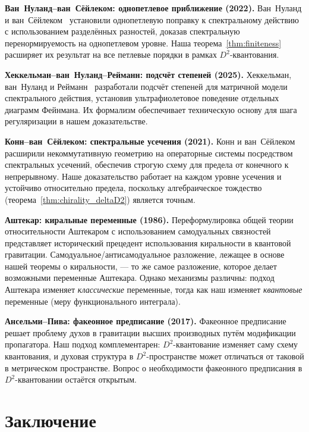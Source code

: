 \documentclass[12pt,a4paper]{article}
\theoremstyle{definition}
\theoremstyle{remark}
\begin{document}
\smallskip\noindent
\textbf{Ван~Нуланд--ван~Сёйлеком: однопетлевое приближение (2022).}
Ван~Нуланд и ван~Сёйлеком~\cite{vanNuland:2021oneloop} установили
однопетлевую поправку к спектральному действию с использованием
разделённых разностей, доказав спектральную перенормируемость на
однопетлевом уровне.  Наша теорема~\ref{thm:finiteness} расширяет их
результат на все петлевые порядки в рамках $D^2$-квантования.

\smallskip\noindent
\textbf{Хеккельман--ван~Нуланд--Рейманн: подсчёт степеней (2025).}
Хеккельман, ван~Нуланд и Рейманн~\cite{Hekkelman:2025power} разработали
подсчёт степеней для матричной модели спектрального действия, установив
ультрафиолетовое поведение отдельных диаграмм Фейнмана.  Их формализм
обеспечивает техническую основу для шага регуляризации в нашем
доказательстве.

\smallskip\noindent
\textbf{Конн--ван~Сёйлеком: спектральные усечения (2021).}
Конн и ван~Сёйлеком~\cite{Connes:2020trunc} расширили некоммутативную
геометрию на операторные системы посредством спектральных усечений,
обеспечив строгую схему для предела от конечного к непрерывному.  Наше
доказательство работает на каждом уровне усечения и устойчиво
относительно предела, поскольку алгебраическое тождество
(теорема~\ref{thm:chirality_deltaD2}) является точным.

\smallskip\noindent
\textbf{Аштекар: киральные переменные (1986).}
Переформулировка общей теории относительности Аштекаром с
использованием самодуальных
связностей~\cite{Ashtekar:1986yd} представляет исторический прецедент
использования киральности в квантовой гравитации.
Самодуальное/антисамодуальное разложение, лежащее в основе нашей
теоремы о киральности, --- то же самое разложение, которое делает
возможными переменные Аштекара.  Однако механизмы различны: подход
Аштекара изменяет \emph{классические} переменные, тогда как наш
изменяет \emph{квантовые} переменные (меру функционального интеграла).

\smallskip\noindent
\textbf{Ансельми--Пива: факеонное предписание (2017).}
Факеонное предписание~\cite{Anselmi:2017ygm} решает проблему духов в
гравитации высших производных путём модификации пропагатора.  Наш
подход комплементарен: $D^2$-квантование изменяет саму схему
квантования, и духовая структура в $D^2$-пространстве может отличаться
от таковой в метрическом пространстве.  Вопрос о необходимости
факеонного предписания в $D^2$-квантовании остаётся открытым.

\section{Заключение}
\label{sec:conclusions}
\end{document}
